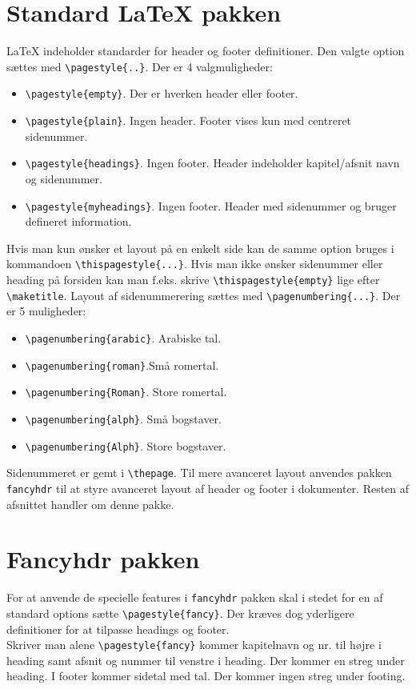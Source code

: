 \documentclass{article}
\begin{document}
\section{Standard \LaTeX{} pakken}
\LaTeX{} indeholder standarder for header og footer definitioner.  Den valgte option sættes med \verb"\pagestyle{..}". Der er 4 valgmuligheder:
\begin{itemize}
\item \verb"\pagestyle{empty}". Der er hverken header eller footer.
\item \verb"\pagestyle{plain}". Ingen header. Footer vises kun med centreret sidenummer.
\item \verb"\pagestyle{headings}". Ingen footer. Header indeholder kapitel/afsnit navn og sidenummer.
\item \verb"\pagestyle{myheadings}". Ingen footer. Header med sidenummer og bruger defineret information.
\end{itemize}
Hvis man kun ønsker et layout på en enkelt side kan de samme option bruges i kommandoen \verb"\thispagestyle{...}". Hvis man ikke ønsker sidenummer eller heading på forsiden kan man f.eks. skrive \verb"\thispagestyle{empty}"  lige efter \verb"\maketitle".
Layout af sidenummerering sættes med \verb"\pagenumbering{...}". Der er 5 muligheder:
\begin{itemize}
\item \verb"\pagenumbering{arabic}". Arabiske tal.
\item \verb"\pagenumbering{roman}".Små romertal.
\item \verb"\pagenumbering{Roman}". Store romertal.
\item \verb"\pagenumbering{alph}". Små bogstaver.
\item \verb"\pagenumbering{Alph}". Store bogstaver.
\end{itemize}
Sidenummeret er gemt i \verb"\thepage".
Til mere avanceret layout anvendes pakken \verb"fancyhdr" til at styre avanceret layout af header og footer i dokumenter. Resten af afsnittet handler om denne pakke.

\section{Fancyhdr pakken}
For at anvende de specielle features i \verb"fancyhdr" pakken skal i stedet for en af standard options sætte \verb"\pagestyle{fancy}". Der kræves dog yderligere definitioner for at tilpasse headings og footer. \\
Skriver man alene \verb"\pagestyle{fancy}" kommer kapitelnavn og nr. til højre i heading samt afsnit og nummer til venstre i heading. Der kommer en streg under heading. I footer kommer sidetal med tal. Der kommer ingen streg under footing.
\end{document}
